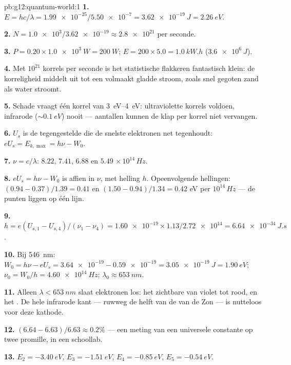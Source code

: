 \begin{solution}{pb:g12:quantum-world:1}
\textbf{1.} $E = hc/\lambda = \num{1.99e-25}/\num{5.50e-7} =
\qty{3.62e-19}{J} = \qty{2.26}{eV}$.

\textbf{2.} $N = \num{1.0e3}/\num{3.62e-19} \approx \num{2.8e21}$  per
seconde.

\textbf{3.} $P = 0.20 \times \qty{1.0e3}{W} = \qty{200}{W}$;
$E = 200 \times 5.0 = \qty{1.0}{kW.h}$ ($\qty{3.6e6}{J}$).

\textbf{4.} Met $10^{21}$ korrels per seconde is het statistische flakkeren
fantastisch klein: de korreligheid middelt uit tot een volmaakt gladde
stroom, zoals snel gegoten zand als water stroomt.

\textbf{5.} Schade vraagt één korrel van \qtyrange{3}{4}{eV}: ultraviolette
korrels voldoen, infrarode ($\sim \qty{0.1}{eV}$) nooit --- aantallen kunnen
de klap per korrel niet vervangen.

\textbf{6.} $U_s$ is de tegengestelde  die de snelste elektronen net
tegenhoudt: $eU_s = E_{k,\max} = h\nu - W_0$.

\textbf{7.} $\nu = c/\lambda$: $8.22$, $7.41$, $6.88$ en $5.49$
$\times\,10^{14}\,\unit{Hz}$.

\textbf{8.} $eU_s = h\nu - W_0$ is affien in $\nu$, met helling $h$.
Opeenvolgende hellingen: $(0.94 - 0.37)/1.39 = 0.41$ en
$(1.50 - 0.94)/1.34 = 0.42$ \unit{eV} per $10^{14}\,\unit{Hz}$ --- de punten
liggen op één lijn.

\textbf{9.} $h = e(U_{s,1}-U_{s,4})/(\nu_1-\nu_4) = \num{1.60e-19}
\times 1.13/\num{2.72e14} = \qty{6.64e-34}{J.s}$.

\textbf{10.} Bij \qty{546}{nm}: $W_0 = h\nu - eU_s = \num{3.64e-19} -
\num{0.59e-19} = \qty{3.05e-19}{J} = \qty{1.90}{eV}$;
$\nu_0 = W_0/h = \qty{4.60e14}{Hz}$; $\lambda_0 \approx \qty{653}{nm}$.

\textbf{11.} Alleen $\lambda < \qty{653}{nm}$ slaat elektronen los: het
zichtbare van violet tot rood, en het . De hele infrarode kant ---
ruwweg de helft van de  van de Zon --- is nutteloos voor deze kathode.

\textbf{12.} $(6.64 - 6.63)/6.63 \approx 0.2\%$ --- een meting van een
universele constante op twee promille, in een schoollab.

\textbf{13.} $E_2 = \qty{-3.40}{eV}$, $E_3 = \qty{-1.51}{eV}$,
$E_4 = \qty{-0.85}{eV}$, $E_5 = \qty{-0.54}{eV}$.


\end{solution}
